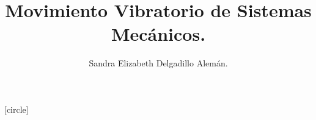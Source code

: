 
\title{Movimiento Vibratorio de Sistemas Mecánicos.}
\author{Sandra Elizabeth Delgadillo Alemán.}

[circle] %

\newcommand\Myref[1]{
  \begingroup
  \usebeamerfont*{item projected}%
  \usebeamercolor[bg]{item projected}%
  \begin{pgfpicture}{-1ex}{0ex}{1ex}{2ex}
    \pgfpathcircle{\pgfpoint{0pt}{.75ex}}{1.2ex}
    \pgfusepath{fill}
    \pgftext[base]{\color{fg}\ref{#1}}
  \end{pgfpicture}%
  \endgroup
}
